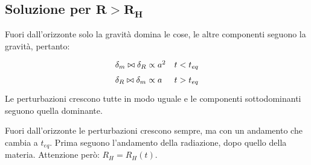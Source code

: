 \subsection{Soluzione per $\mathbf{R > R_H}$}
Fuori dall'orizzonte solo la gravità domina le cose, le altre componenti seguono la gravità, pertanto:
\begin{equation}
    \def\arraystretch{1.5}
        \begin{array}{ll}
        \delta_m \bowtie  \delta_R \propto a^2 & t<t_{eq} \\
        \delta_R \bowtie  \delta_m \propto a & t>t_{eq} 
    \end{array} \label{eq:unitaplanckiane}
\end{equation}
Le perturbazioni crescono tutte in modo uguale e le componenti sottodominanti seguono quella dominante.

\begin{theorem}
Fuori dall'orizzonte le perturbazioni crescono sempre, ma con un andamento che cambia a $t_{eq}$. Prima seguono l'andamento della radiazione, dopo quello della materia. Attenzione però: $R_H=R_H(t)$.
\end{theorem}



